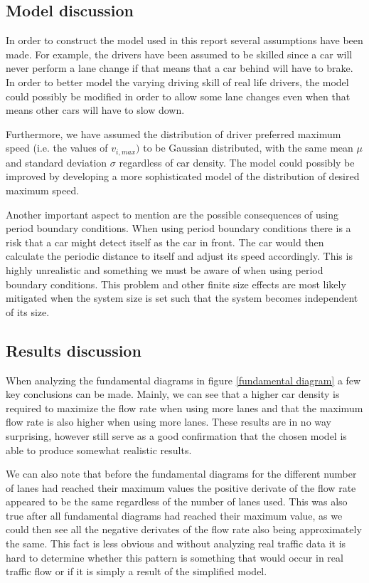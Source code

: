 \documentclass[a4paper,12pt]{article}
\begin{document}
\subsection*{Model discussion}
In order to construct the model used in this report several assumptions have been made. For example, the drivers have been assumed to be skilled
since a car will never perform a lane change if that means that a car behind will have to brake. In order to better model the varying
driving skill of real life drivers, the model could possibly be modified in order to allow some lane changes even when that means other 
cars will have to slow down.

Furthermore, we have assumed the distribution of driver preferred maximum speed (i.e. the values of $v_{i,max})$ to be Gaussian distributed, with the same mean $\mu$ and standard
deviation $\sigma$ regardless of car density.
The model could possibly be improved by developing a more sophisticated model of the distribution of desired maximum speed.

Another important aspect to mention are the possible consequences of using period boundary conditions. When using period boundary conditions there is a risk
that a car might detect itself as the car in front. The car would then calculate the periodic distance to itself and adjust its speed accordingly. 
This is highly unrealistic and something we must be aware of when using period boundary conditions. This problem and other finite size effects are most
likely mitigated when the system size is set such that the system becomes independent of its size.

\subsection*{Results discussion}
When analyzing the fundamental diagrams in figure \ref*{fundamental diagram} a few key conclusions can be made.
Mainly, we can see that a higher car density is required to maximize the flow rate when using more lanes and that
the maximum flow rate is also higher when using more lanes. These results are in no way surprising, however still serve
as a good confirmation that the chosen model is able to produce somewhat realistic results. 

We can also note that before the fundamental diagrams for the different number of lanes had reached their maximum values the positive derivate of the flow rate appeared to be the same
regardless of the number of lanes used.
This was also true after all fundamental diagrams had reached their maximum value, as we could then see all the negative derivates of the flow rate also being approximately the same.
This fact is less obvious and without analyzing real traffic data it is hard to determine whether this pattern is something that would occur in real traffic flow or if it is simply
a result of the simplified model. 
\end{document}
